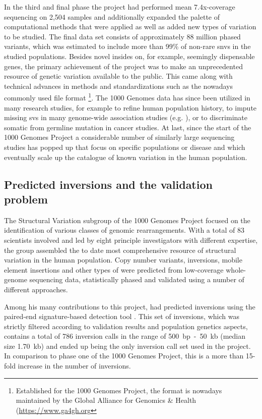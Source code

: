 In the third and final phase the project had performed mean 7.4x-coverage
sequencing on 2,504 samples and additionally expanded the palette of
computational methods that were applied as well as added new types of variation
to be studied\citep{Auton2015}. The final data set consists of approximately
88 million phased variants, which was estimated to include more than 99\% of
non-rare \acp{snv} in the studied populations. Besides novel insides on, for example,
seemingly dispensable genes, the primary achievement of the project was to make
an unprecedented resource of genetic variation available to the public. This
came along with technical advances in methods and standardizations such as the
nowadays commonly used file format \vcf\footnote{Established for the
1000 Genomes Project, the format is nowadays maintained by the Global Alliance
for Genomics \& Health (\url{https://www.ga4gh.org}}.
The 1000 Genomes data has since been utilized in many research studies, for
example to refine human population history\citep{Veeramah2014}, to
impute\citep{Howie2012} missing \acp{sv} in many genome-wide association studies
(e.g. \cite{Wood2014}), or to discriminate somatic from germline mutation in
cancer studies\citep{Hiltemann2015}. At last, since the start of the 1000
Genomes Project a considerable number of similarly large sequencing studies has
popped up that focus on specific populations\citep{UK10K,Sulem2015,Telenti2016}
or disease\citep{Campbell2017} and which eventually scale up the catalogue of
known variation in the human population.





\subsection{Predicted inversions and the validation problem}

The Structural Variation subgroup of the 1000 Genomes Project focused on the
identification of various classes of genomic rearrangements. With a total of 83
scientists involved and led by eight principle investigators with different
expertise, the group assembled the to date most comprehensive resource of
structural variation in the human population. Copy number variants, inversions,
mobile element insertions and other types of \sv were predicted from
low-coverage whole-genome sequencing data, statistically phased and
validated using a number of different approaches.

Among his many contributions to this project, \tobias had predicted inversions
using the paired-end signature-based \sv detection tool \delly. This set of
inversions, which was strictly filtered according to validation results and
population genetics aspects, contains a total of 786 inversion calls in the
range of 500~bp~-~50~kb (median size 1.70~kb) and ended up being the only
inversion call set used in the project. In comparison to phase one of the 1000
Genomes Project, this is a more than 15-fold increase in the number of
inversions.

